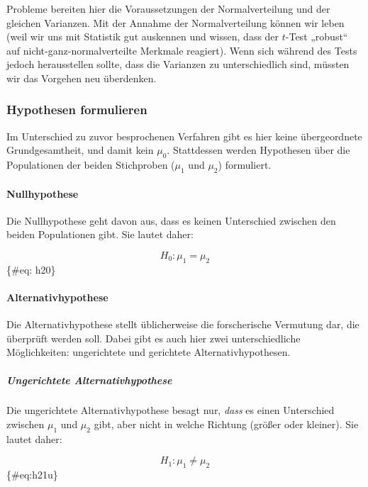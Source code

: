 \documentclass[
  ngerman,
]{article}
\begin{document}
Probleme bereiten hier die Voraussetzungen der Normalverteilung und der gleichen Varianzen. Mit der Annahme der Normalverteilung können wir leben (weil wir uns mit Statistik gut auskennen und wissen, dass der \(t\)-Test „robust`` auf nicht-ganz-normalverteilte Merkmale reagiert). Wenn sich während des Tests jedoch herausstellen sollte, dass die Varianzen zu unterschiedlich sind, müssten wir das Vorgehen neu überdenken.

\hypertarget{hypothesen-formulieren-2}{%
\subsubsection{Hypothesen formulieren}\label{hypothesen-formulieren-2}}

Im Unterschied zu zuvor besprochenen Verfahren gibt es hier keine übergeordnete Grundgesamtheit, und damit kein \(\mu_0\). Stattdessen werden Hypothesen über die Populationen der beiden Stichproben (\(\mu_1\) und \(\mu_2\)) formuliert.

\hypertarget{nullhypothese-2}{%
\paragraph{Nullhypothese}\label{nullhypothese-2}}

Die Nullhypothese geht davon aus, dass es keinen Unterschied zwischen den beiden Populationen gibt. Sie lautet daher:

\[
H_0 : \mu_1 = \mu_2
\]\{\#eq: h20\}

\hypertarget{alternativhypothese-2}{%
\paragraph{Alternativhypothese}\label{alternativhypothese-2}}

Die Alternativhypothese stellt üblicherweise die forscherische Vermutung dar, die überprüft werden soll. Dabei gibt es auch hier zwei unterschiedliche Möglichkeiten: ungerichtete und gerichtete Alternativhypothesen.

\hypertarget{ungerichtete-alternativhypothese-1}{%
\subparagraph{Ungerichtete Alternativhypothese}\label{ungerichtete-alternativhypothese-1}}

Die ungerichtete Alternativhypothese besagt nur, \emph{dass} es einen Unterschied zwischen \(\mu_1\) und \(\mu_2\) gibt, aber nicht in welche Richtung (größer oder kleiner). Sie lautet daher:

\[
H_1 : \mu_1 \neq \mu_2
\]\{\#eq:h21u\}
\end{document}
